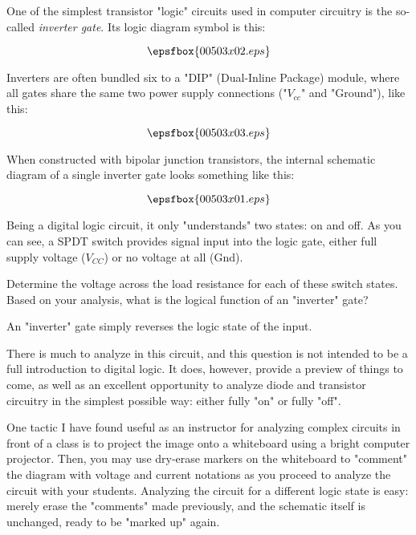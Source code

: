 

One of the simplest transistor "logic" circuits used in computer circuitry is the so-called {\it inverter gate}.  Its logic diagram symbol is this:

$$\epsfbox{00503x02.eps}$$

Inverters are often bundled six to a "DIP" (Dual-Inline Package) module, where all gates share the same two power supply connections ("$V_{cc}$" and "Ground"), like this:

$$\epsfbox{00503x03.eps}$$

When constructed with bipolar junction transistors, the internal schematic diagram of a single inverter gate looks something like this:

$$\epsfbox{00503x01.eps}$$

Being a digital logic circuit, it only "understands" two states: on and off.  As you can see, a SPDT switch provides signal input into the logic gate, either full supply voltage ($V_{CC}$) or no voltage at all (Gnd).

Determine the voltage across the load resistance for each of these switch states.  Based on your analysis, what is the logical function of an "inverter" gate?







An "inverter" gate simply reverses the logic state of the input.







There is much to analyze in this circuit, and this question is not intended to be a full introduction to digital logic.  It does, however, provide a preview of things to come, as well as an excellent opportunity to analyze diode and transistor circuitry in the simplest possible way: either fully "on" or fully "off".

One tactic I have found useful as an instructor for analyzing complex circuits in front of a class is to project the image onto a whiteboard using a bright computer projector.  Then, you may use dry-erase markers on the whiteboard to "comment" the diagram with voltage and current notations as you proceed to analyze the circuit with your students.  Analyzing the circuit for a different logic state is easy: merely erase the "comments" made previously, and the schematic itself is unchanged, ready to be "marked up" again.




